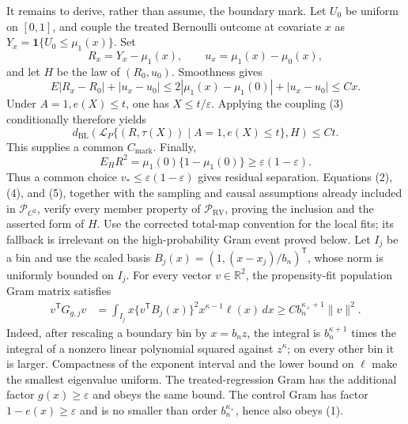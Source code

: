 It remains to derive, rather than assume, the boundary mark.  Let \(U_0\) be uniform on \([0,1]\), and couple the treated Bernoulli outcome at covariate \(x\) as \(Y_x=\mathbf1\{U_0\leq\mu_1(x)\}\).  Set
\[
 R_x=Y_x-\mu_1(x),\qquad u_x=\mu_1(x)-\mu_0(x),
\]
and let \(H\) be the law of \((R_0,u_0)\).  Smoothness gives
\[
 E|R_x-R_0|+|u_x-u_0|
 \leq 2|\mu_1(x)-\mu_1(0)|+|u_x-u_0|\leq Cx. \tag{3}
\]
Under \(A=1,e(X)\leq t\), one has \(X\leq t/\varepsilon\).  Applying the coupling (3) conditionally therefore yields
\[
 d_{\mathrm{BL}}\!\left(\mathcal L_P\{(R,\tau(X))\mid A=1,e(X)\leq t\},H\right)
 \leq Ct. \tag{4}
\]
This supplies a common \(C_{\mathrm{mark}}\).  Finally,
\[
 E_HR^2=\mu_1(0)\{1-\mu_1(0)\}\geq\varepsilon(1-\varepsilon). \tag{5}
\]
Thus a common choice \(v_*\leq\varepsilon(1-\varepsilon)\) gives residual separation.  Equations (2), (4), and (5), together with the sampling and causal assumptions already included in \(\mathcal P_{C^2}\), verify every member property of \(\mathcal P_{\mathrm{RV}}\), proving the inclusion and the asserted form of \(H\).
Use the corrected total-map convention for the local fits; its fallback is irrelevant on the high-probability Gram event proved below.  Let \(I_j\) be a bin and use the scaled basis \(B_j(x)=(1,(x-x_j)/b_n)^{\mathsf T}\), whose norm is uniformly bounded on \(I_j\).  For every vector \(v\in\mathbb R^2\), the propensity-fit population Gram matrix satisfies
\[
\begin{split}
 v^{\mathsf T}G_{g,j}v
 &=\int_{I_j}x\{v^{\mathsf T}B_j(x)\}^2x^{\kappa-1}\ell(x)\,dx
 \geq C b_n^{\kappa_++1}\|v\|^2.
\end{split} \tag{1}
\]
Indeed, after rescaling a boundary bin by \(x=b_nz\), the integral is \(b_n^{\kappa+1}\) times the integral of a nonzero linear polynomial squared against \(z^\kappa\); on every other bin it is larger.  Compactness of the exponent interval and the lower bound on \(\ell\) make the smallest eigenvalue uniform.  The treated-regression Gram has the additional factor \(g(x)\geq\varepsilon\) and obeys the same bound.  The control Gram has factor \(1-e(x)\geq\varepsilon\) and is no smaller than order \(b_n^{\kappa_+}\), hence also obeys (1).

